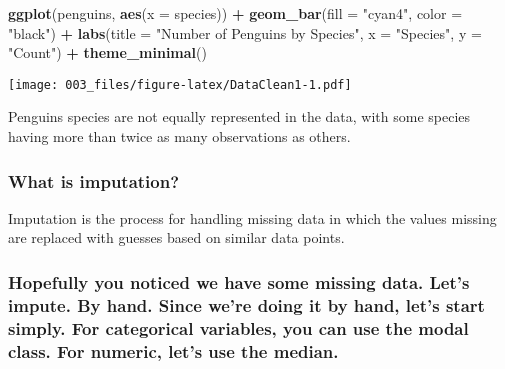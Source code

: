 \documentclass[
]{article}
\newenvironment{Shaded}{\begin{snugshade}}{\end{snugshade}}
\newcommand{\AttributeTok}[1]{\textcolor[rgb]{0.13,0.29,0.53}{#1}}
\newcommand{\FunctionTok}[1]{\textcolor[rgb]{0.13,0.29,0.53}{\textbf{#1}}}
\newcommand{\NormalTok}[1]{#1}
\newcommand{\SpecialCharTok}[1]{\textcolor[rgb]{0.81,0.36,0.00}{\textbf{#1}}}
\newcommand{\StringTok}[1]{\textcolor[rgb]{0.31,0.60,0.02}{#1}}
\begin{document}
\begin{Shaded}
\begin{Highlighting}[]
\FunctionTok{ggplot}\NormalTok{(penguins, }\FunctionTok{aes}\NormalTok{(}\AttributeTok{x =}\NormalTok{ species)) }\SpecialCharTok{+}
  \FunctionTok{geom\_bar}\NormalTok{(}\AttributeTok{fill =} \StringTok{"cyan4"}\NormalTok{, }\AttributeTok{color =} \StringTok{"black"}\NormalTok{) }\SpecialCharTok{+}
  \FunctionTok{labs}\NormalTok{(}\AttributeTok{title =} \StringTok{"Number of Penguins by Species"}\NormalTok{,}
       \AttributeTok{x =} \StringTok{"Species"}\NormalTok{,}
       \AttributeTok{y =} \StringTok{"Count"}\NormalTok{) }\SpecialCharTok{+}
  \FunctionTok{theme\_minimal}\NormalTok{()}
\end{Highlighting}
\end{Shaded}

\texttt{[image: 003\_files/figure-latex/DataClean1-1.pdf]}

Penguins species are not equally represented in the data, with some
species having more than twice as many observations as others.

\subsubsection{What is imputation?}\label{what-is-imputation}

Imputation is the process for handling missing data in which the values
missing are replaced with guesses based on similar data points.

\subsubsection{Hopefully you noticed we have some missing data. Let's
impute. By hand. Since we're doing it by hand, let's start simply. For
categorical variables, you can use the modal class. For numeric, let's
use the
median.}\label{hopefully-you-noticed-we-have-some-missing-data.-lets-impute.-by-hand.-since-were-doing-it-by-hand-lets-start-simply.-for-categorical-variables-you-can-use-the-modal-class.-for-numeric-lets-use-the-median.}
\end{document}
